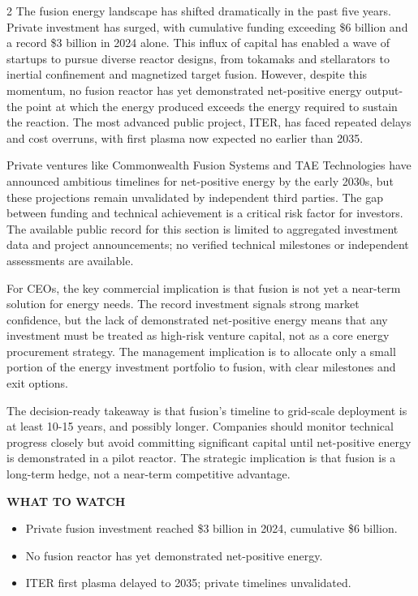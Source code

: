 \documentclass[10pt,a4paper]{article}
\begin{document}
\begin{multicols}{2}
{\small The fusion energy landscape has shifted dramatically in the past five years. Private investment has surged, with cumulative funding exceeding \$6 billion and a record \$3 billion in 2024 alone. This influx of capital has enabled a wave of startups to pursue diverse reactor designs, from tokamaks and stellarators to inertial confinement and magnetized target fusion. However, despite this momentum, no fusion reactor has yet demonstrated net-positive energy output-the point at which the energy produced exceeds the energy required to sustain the reaction. The most advanced public project, ITER, has faced repeated delays and cost overruns, with first plasma now expected no earlier than 2035.}\par
{\small Private ventures like Commonwealth Fusion Systems and TAE Technologies have announced ambitious timelines for net-positive energy by the early 2030s, but these projections remain unvalidated by independent third parties. The gap between funding and technical achievement is a critical risk factor for investors. The available public record for this section is limited to aggregated investment data and project announcements; no verified technical milestones or independent assessments are available.}\par
{\small For CEOs, the key commercial implication is that fusion is not yet a near-term solution for energy needs. The record investment signals strong market confidence, but the lack of demonstrated net-positive energy means that any investment must be treated as high-risk venture capital, not as a core energy procurement strategy. The management implication is to allocate only a small portion of the energy investment portfolio to fusion, with clear milestones and exit options.}\par
{\small The decision-ready takeaway is that fusion's timeline to grid-scale deployment is at least 10-15 years, and possibly longer. Companies should monitor technical progress closely but avoid committing significant capital until net-positive energy is demonstrated in a pilot reactor. The strategic implication is that fusion is a long-term hedge, not a near-term competitive advantage.}\par
\end{multicols}
\vspace{4pt}\noindent\begin{minipage}{\linewidth}
{\textcolor{BOGreen}{\scriptsize\bfseries WHAT TO WATCH}}\par\vspace{2pt}
{\footnotesize\begin{itemize}
\item Private fusion investment reached \$3 billion in 2024, cumulative \$6 billion.
\item No fusion reactor has yet demonstrated net-positive energy.
\item ITER first plasma delayed to 2035; private timelines unvalidated.
\end{itemize}}
\end{minipage}
\label{chap:1:end}
\end{document}
